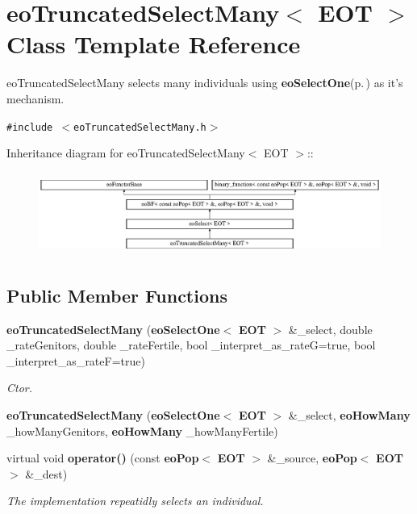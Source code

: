 \section{eo\-Truncated\-Select\-Many$<$ EOT $>$ Class Template Reference}
\label{classeo_truncated_select_many}
eo\-Truncated\-Select\-Many selects many individuals using {\bf eo\-Select\-One}{\rm (p.\,\pageref{classeo_select_one})} as it's mechanism.  


{\tt \#include $<$eo\-Truncated\-Select\-Many.h$>$}

Inheritance diagram for eo\-Truncated\-Select\-Many$<$ EOT $>$::\begin{figure}[H]
\begin{center}
\leavevmode
\includegraphics[height=2.75184cm]{classeo_truncated_select_many}
\end{center}
\end{figure}
\subsection*{Public Member Functions}
\begin{CompactItemize}
\item 
{\bf eo\-Truncated\-Select\-Many} ({\bf eo\-Select\-One}$<$ {\bf EOT} $>$ \&\_\-select, double \_\-rate\-Genitors, double \_\-rate\-Fertile, bool \_\-interpret\_\-as\_\-rate\-G=true, bool \_\-interpret\_\-as\_\-rate\-F=true)\label{classeo_truncated_select_many_a0}

\begin{CompactList}\small\item\em Ctor. \item\end{CompactList}\item 
{\bf eo\-Truncated\-Select\-Many} ({\bf eo\-Select\-One}$<$ {\bf EOT} $>$ \&\_\-select, {\bf eo\-How\-Many} \_\-how\-Many\-Genitors, {\bf eo\-How\-Many} \_\-how\-Many\-Fertile)\label{classeo_truncated_select_many_a1}

\item 
virtual void {\bf operator()} (const {\bf eo\-Pop}$<$ {\bf EOT} $>$ \&\_\-source, {\bf eo\-Pop}$<$ {\bf EOT} $>$ \&\_\-dest)
\begin{CompactList}\small\item\em The implementation repeatidly selects an individual. \item\end{CompactList}\end{CompactItemize}
